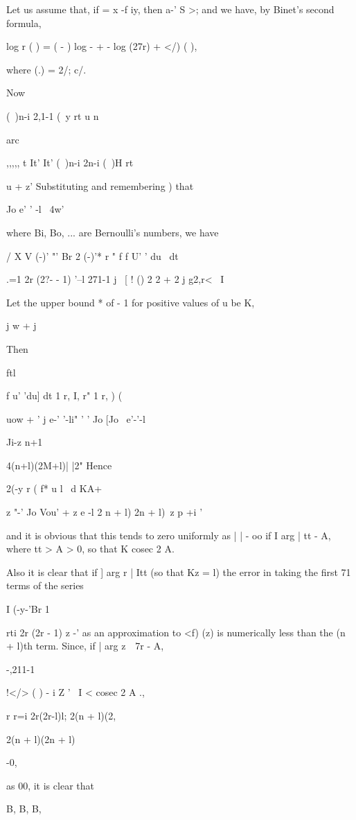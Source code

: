 Let us assume that, if = x -f iy, then a-' S >; and we have, by
Binet's second formula,

log r ( ) = ( - ) log - + - log (27r) + </) ( ),

where (.) = 2/; c/.

Now

(\ )n-i 2,1-1 (\ y rt u n

arc

,,,,, t It' It' (\ )n-i 2n-i (\ )H rt

u + z' Substituting and remembering ) that

Jo e' ' -l ~4w'

%
%

where Bi, Bo, ... are Bernoulli's numbers, we have

  / X V (-)' "' Br 2 (-)'* r " f f U' ' du \ dt

.=1 2r (2?- - 1) '--l 271-1 j \ [ ! () 2 2 + 2 j g2,r< \ I

Let the upper bound * of - 1 for positive values of u be K,

j w + j

Then

ftl

f u' 'du] dt 1 r, I, r" 1 r, ) (

uow + ' j e-' '-li" ' ' Jo [Jo \ e'-'-l

Ji-z n+1

 4(n+l)(2M+l)| |2" Hence

2(-y r ( f* u l \ d KA+

z "-' Jo Vou' + z e -l 2 n + l) 2n + l)\ z p +i '

and it is obvious that this tends to zero uniformly as | | - oo if I
arg | tt - A, where tt > A > 0, so that K cosec 2 A.

Also it is clear that if ] arg r | Itt (so that Kz = l) the error in
taking the first 71 terms of the series

I (-y-'Br 1

rti 2r (2r - 1) z -' as an approximation to <f) (z) is numerically
less than the (n + l)th term. Since, if | arg z\ \ 7r - A,

-,211-1

!</> ( ) - i Z ' \ I < cosec 2 A .,

r r=i 2r(2r-l)l; 2(n + l)(2,

2(n + l)(2n + l)

-0,

as 00, it is clear that

B, B, B,

